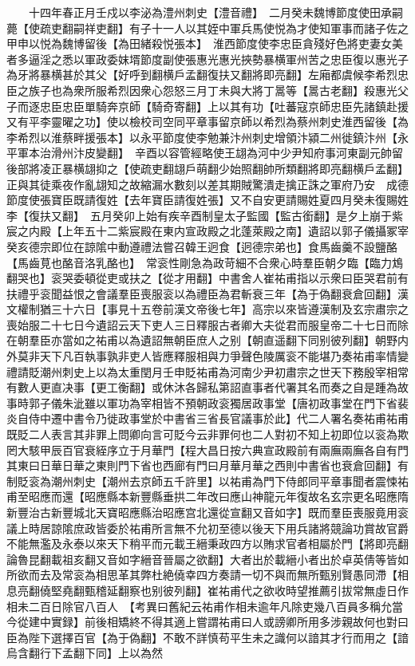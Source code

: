 　　十四年春正月壬戍以李泌為澧州刺史【澧音禮】　二月癸未魏博節度使田承嗣薨【使疏吏翻嗣祥吏翻】有子十一人以其姪中軍兵馬使悦為才使知軍事而諸子佐之甲申以悦為魏博留後【為田緒殺悦張本】　淮西節度使李忠臣貪殘好色將吏妻女美者多逼淫之悉以軍政委妺壻節度副使張惠光惠光挾勢暴横軍州苦之忠臣復以惠光子為牙將暴横甚於其父【好呼到翻横戶孟翻復扶又翻將即亮翻】左廂都虞候李希烈忠臣之族子也為衆所服希烈因衆心怨怒三月丁未與大將丁暠等【暠古老翻】殺惠光父子而逐忠臣忠臣單騎奔京師【騎奇寄翻】上以其有功【吐蕃寇京師忠臣先諸鎮赴援又有平李靈曜之功】使以檢校司空同平章事留京師以希烈為蔡州刺史淮西留後【為李希烈以淮蔡畔援張本】以永平節度使李勉兼汴州刺史增領汴潁二州徙鎮汴州【永平軍本治滑州汴皮變翻】　辛酉以容管經略使王翃為河中少尹知府事河東副元帥留後部將凌正暴横翃抑之【使疏吏翻翃戶萌翻少始照翻帥所類翻將即亮翻横戶孟翻】正與其徒乘夜作亂翃知之故縮漏水數刻以差其期賊驚潰走擒正誅之軍府乃安　成德節度使張寶臣既請復姓【去年寶臣請復姓張】又不自安更請賜姓夏四月癸未復賜姓李【復扶又翻】　五月癸卯上始有疾辛酉制皇太子監國【監古銜翻】是夕上崩于紫宸之内殿【上年五十二紫宸殿在東内宣政殿之北蓬萊殿之南】遺詔以郭子儀攝冢宰癸亥德宗即位在諒隂中動遵禮法嘗召韓王迥食【迥德宗弟也】食馬齒羹不設鹽酪【馬齒莧也酪音洛乳酪也】　常衮性剛急為政苛細不合衆心時羣臣朝夕臨【臨力鴆翻哭也】衮哭委頓從吏或扶之【從才用翻】中書舍人崔祐甫指以示衆曰臣哭君前有扶禮乎衮聞益恨之會議羣臣喪服衮以為禮臣為君斬衰三年【為于偽翻衰倉回翻】漢文權制猶三十六日【事見十五卷前漢文帝後七年】高宗以來皆遵漢制及玄宗肅宗之喪始服二十七日今遺詔云天下吏人三日釋服古者卿大夫從君而服皇帝二十七日而除在朝羣臣亦當如之祐甫以為遺詔無朝臣庶人之别【朝直遥翻下同别彼列翻】朝野内外莫非天下凡百執事孰非吏人皆應釋服相與力爭聲色陵厲衮不能堪乃奏祐甫率情變禮請貶潮州刺史上以為太重閏月壬申貶祐甫為河南少尹初肅宗之世天下務殷宰相常有數人更直决事【更工衡翻】或休沐各歸私第詔直事者代署其名而奏之自是踵為故事時郭子儀朱泚雖以軍功為宰相皆不預朝政衮獨居政事堂【唐初政事堂在門下省裴炎自侍中遷中書令乃徙政事堂於中書省三省長官議事於此】代二人署名奏祐甫祐甫既貶二人表言其非罪上問卿向言可貶今云非罪何也二人對初不知上初即位以衮為欺罔大駭甲辰百官衰絰序立于月華門【程大昌日按六典宣政殿前有兩廡兩廡各自有門其東曰日華日華之東則門下省也西廊有門曰月華月華之西則中書省也衰倉回翻】有制貶衮為潮州刺史【潮州去京師五千許里】以祐甫為門下侍郎同平章事聞者震悚祐甫至昭應而還【昭應縣本新豐縣垂拱二年改曰應山神龍元年復故名玄宗更名昭應隋新豐治古新豐城北天寶昭應縣治昭應宫北還從宣翻又音如字】既而羣臣喪服竟用衮議上時居諒隂庶政皆委於祐甫所言無不允初至德以後天下用兵諸將競論功賞故官爵不能無濫及永泰以來天下稍平而元載王縉秉政四方以賄求官者相屬於門【將即亮翻論魯昆翻載祖亥翻又音如字縉音晉屬之欲翻】大者出於載縉小者出於卓英倩等皆如所欲而去及常衮為相思革其弊杜絶僥幸四方奏請一切不與而無所甄别賢愚同滯【相息亮翻僥堅堯翻甄稽延翻察也别彼列翻】崔祐甫代之欲收時望推薦引拔常無虛日作相未二百日除官八百人　【考異曰舊紀云祐甫作相未逾年凡除吏幾八百員多稱允當今從建中實録】前後相矯終不得其適上嘗謂祐甫曰人或謗卿所用多涉親故何也對曰臣為陛下選擇百官【為于偽翻】不敢不詳慎苟平生未之識何以諳其才行而用之【諳烏含翻行下孟翻下同】上以為然

